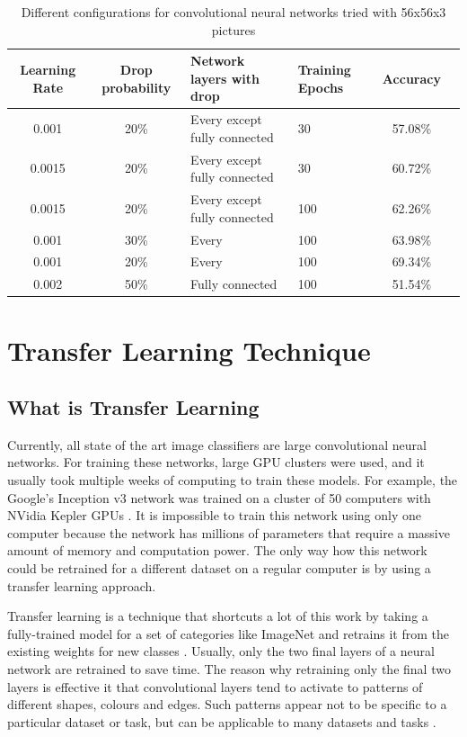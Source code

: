 \begin{table}[h]
\begin{center}
\begin{tabular}{ |c|c|p{3.3 cm}|p{2 cm}|c|c|} 
 \hline
 Learning Rate & Drop probability & Network layers with drop &Training Epochs&Accuracy \\   \hline
0.001   &   20\%  & Every except fully  connected  & 30 & 57.08\% \\ \hline
0.0015    &   20\%   &  Every  except fully connected  & 30  & 60.72\% \\ \hline
0.0015    &   20\%   &  Every  except fully connected  & 100  & 62.26\% \\ \hline
0.001    &   30\%   &  Every  & 100  & 63.98\% \\ \hline
0.001    &   20\%   &  Every  & 100  & 69.34\% \\ \hline
0.002    &   50\%   &  Fully connected& 100  & 51.54\% \\  \hline
\end{tabular}
\caption{Different configurations for convolutional neural networks tried with 56x56x3 pictures}
\label{table:53x53}
\end{center}
\end{table}



\section{Transfer Learning Technique}

\subsection{What is Transfer Learning}

Currently, all state of the art image classifiers are large convolutional neural networks.  For training these networks, large GPU clusters were used, and it usually took multiple weeks of computing to train these models. For example,  the Google's Inception v3 network was trained on a cluster of  50 computers with  NVidia Kepler GPUs \cite{incept}. It is impossible to train this network using only one computer because the network has millions of parameters that require a massive amount of memory and computation power. The only way how this network could be retrained for a different dataset on a regular computer is by using a transfer learning approach. 

Transfer learning is a technique that shortcuts a lot of this work by taking a fully-trained model for a set of categories like ImageNet and retrains it from the existing weights for new classes \cite{tensorflow}. Usually, only the two final layers of a neural network are retrained to save time. The reason why retraining only the final two layers is effective it that convolutional layers tend to activate to patterns of different shapes, colours and edges. Such patterns appear not to be specific to a particular dataset or task, but can be applicable to many datasets and tasks \cite{transfer}.

